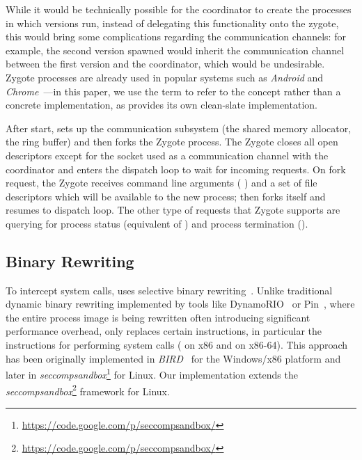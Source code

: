  While it would be technically possible for the coordinator
to create the processes in which versions run, instead of delegating this
functionality onto the zygote, this would bring some complications regarding
the communication channels: for example, the second version spawned would
inherit the communication channel between the first version and the
coordinator, which would be undesirable.  Zygote processes are already used in
popular systems such as \textit{Android} and
\textit{Chrome}~\cite{linuxzygote}---in this paper, we use the term to refer to
the concept rather than a concrete implementation, as \vx provides its own
clean-slate implementation.

After start, \vx sets up the communication subsystem (\ie the shared memory
allocator, the ring buffer) and then forks the Zygote process. The Zygote
closes all open descriptors except for the socket used as a communication
channel with the coordinator and enters the dispatch loop to wait for incoming
requests. On fork request, the Zygote receives command line arguments (\ie
{}) and a set of file descriptors which will be available to the new
process; then forks itself and resumes to dispatch loop. The other type of
requests that Zygote supports are querying for process status (\ie equivalent
of ) and process termination (\ie {}).

\subsection{Binary Rewriting}
\label{sec:rewriting}

To intercept system calls, \vx uses selective binary rewriting~\cite{bird}.
Unlike traditional dynamic binary rewriting implemented by tools like
DynamoRIO~\cite{dynamorio02} or Pin~\cite{pin05}, where the entire process
image is being rewritten often introducing significant performance overhead,
\vx only replaces certain instructions, in particular the instructions for
performing system calls (\ie {} on x86 and  on
x86-64).  This approach has been originally implemented in
\emph{BIRD}~\cite{bird} for the Windows/x86 platform and later in
\emph{seccompsandbox}\footnote{\url{https://code.google.com/p/seccompsandbox/}}
for Linux.  Our implementation extends the
\emph{seccompsandbox}\footnote{\url{https://code.google.com/p/seccompsandbox/}}
framework for Linux.

